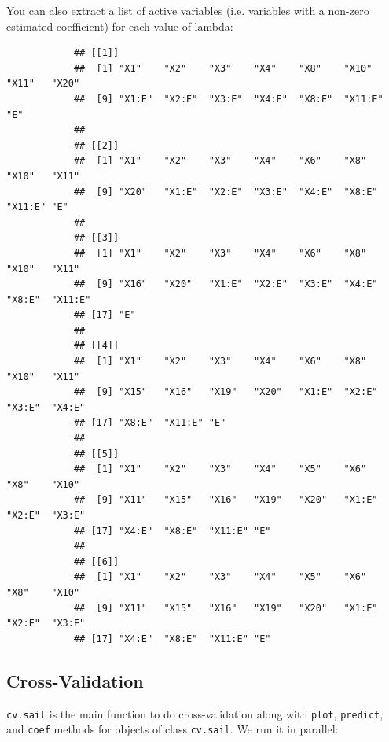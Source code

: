 			
			You can also extract a list of active variables (i.e. variables with a non-zero estimated coefficient) for each value of lambda:
			
			\begin{knitrout}\scriptsize
			\color{fgcolor}\begin{kframe}
			\begin{alltt}
			\hlstd{fit[[}\hlstd{]][}\hlopt{:}\hlstd{]}
			\end{alltt}
			\begin{verbatim}
			## [[1]]
			##  [1] "X1"    "X2"    "X3"    "X4"    "X8"    "X10"   "X11"   "X20"  
			##  [9] "X1:E"  "X2:E"  "X3:E"  "X4:E"  "X8:E"  "X11:E" "E"    
			## 
			## [[2]]
			##  [1] "X1"    "X2"    "X3"    "X4"    "X6"    "X8"    "X10"   "X11"  
			##  [9] "X20"   "X1:E"  "X2:E"  "X3:E"  "X4:E"  "X8:E"  "X11:E" "E"    
			## 
			## [[3]]
			##  [1] "X1"    "X2"    "X3"    "X4"    "X6"    "X8"    "X10"   "X11"  
			##  [9] "X16"   "X20"   "X1:E"  "X2:E"  "X3:E"  "X4:E"  "X8:E"  "X11:E"
			## [17] "E"    
			## 
			## [[4]]
			##  [1] "X1"    "X2"    "X3"    "X4"    "X6"    "X8"    "X10"   "X11"  
			##  [9] "X15"   "X16"   "X19"   "X20"   "X1:E"  "X2:E"  "X3:E"  "X4:E" 
			## [17] "X8:E"  "X11:E" "E"    
			## 
			## [[5]]
			##  [1] "X1"    "X2"    "X3"    "X4"    "X5"    "X6"    "X8"    "X10"  
			##  [9] "X11"   "X15"   "X16"   "X19"   "X20"   "X1:E"  "X2:E"  "X3:E" 
			## [17] "X4:E"  "X8:E"  "X11:E" "E"    
			## 
			## [[6]]
			##  [1] "X1"    "X2"    "X3"    "X4"    "X5"    "X6"    "X8"    "X10"  
			##  [9] "X11"   "X15"   "X16"   "X19"   "X20"   "X1:E"  "X2:E"  "X3:E" 
			## [17] "X4:E"  "X8:E"  "X11:E" "E"
			\end{verbatim}
			\end{kframe}
			\end{knitrout}
			
			
			\subsection{Cross-Validation}
			
			\texttt{cv.sail} is the main function to do cross-validation along with \texttt{plot}, \texttt{predict}, and \texttt{coef} methods for objects of class \texttt{cv.sail}. We run it in parallel:
			
